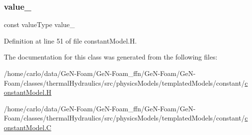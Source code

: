 \subsubsection{\texorpdfstring{value\+\_\+}{value\_}}
{\footnotesize\ttfamily const value\+Type value\+\_\+\hspace{0.3cm}{\ttfamily [protected]}}



Definition at line 51 of file constant\+Model.\+H.



The documentation for this class was generated from the following files\+:\begin{DoxyCompactItemize}
\item 
/home/carlo/data/\+Ge\+N-\/\+Foam/\+Ge\+N-\/\+Foam\+\_\+ffn/\+Ge\+N-\/\+Foam/\+Ge\+N-\/\+Foam/classes/thermal\+Hydraulics/src/physics\+Models/templated\+Models/constant/\hyperlink{constantModel_8H}{constant\+Model.\+H}\item 
/home/carlo/data/\+Ge\+N-\/\+Foam/\+Ge\+N-\/\+Foam\+\_\+ffn/\+Ge\+N-\/\+Foam/\+Ge\+N-\/\+Foam/classes/thermal\+Hydraulics/src/physics\+Models/templated\+Models/constant/\hyperlink{constantModel_8C}{constant\+Model.\+C}\end{DoxyCompactItemize}
